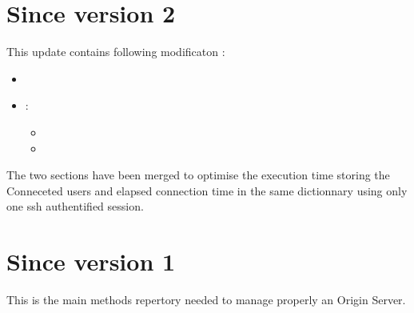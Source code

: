 \documentclass[letterpaper,10pt,english]{sphinxmanual}
\begin{document}
\newpage
\section{Since version 2}
\label{\detokenize{Origin_API:since-version-2}}
\sphinxAtStartPar
This update contains following modificaton :
\begin{itemize}
\item {} 
\sphinxAtStartPar
{}

\item {} 
\sphinxAtStartPar
{} :
\begin{itemize}
\item {} 
\sphinxAtStartPar
{}

\item {} 
\sphinxAtStartPar
{}

\end{itemize}

\end{itemize}

\sphinxAtStartPar
The two sections have been merged to optimise the execution time storing the Conneceted users and elapsed connection time in the same dictionnary using only one ssh authentified session.

\newpage
\section{Since version 1}
\label{\detokenize{Origin_API:since-version-1}}
\sphinxAtStartPar
This is the main methods repertory needed to manage properly an Origin Server.
\end{document}
